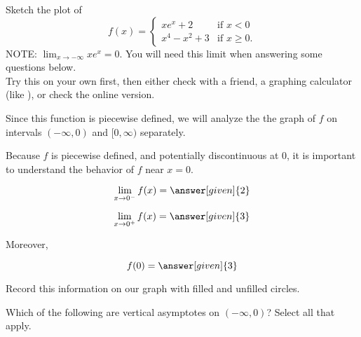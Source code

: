 \documentclass[wordchoicegiven]{ximera}
\begin{document}
\begin{example}
Sketch the plot of 
\[
f(x) = \begin{cases} xe^x+2 &\text{if $x<0$} \\
x^4-x^2+3 &\text{if $x \geq 0$}.
\end{cases}
\]
NOTE: $\lim_{x \to -\infty}xe^x=0$. You will need this limit when answering some questions below.\\
 Try this on your own first, then either check with a friend, a graphing calculator (like ), or check the online version.


	Since this function is piecewise defined, we will analyze the the graph of $f$ on intervals $(-\infty,0)$ and $[0,\infty)$ separately.

	Because $f$ is piecewise defined, and potentially discontinuous at $0$, it is important to understand the behavior of $f$ near $x = 0$.
	
	\[
		\lim_{x \to 0^-} f(x) = \answer[given]{2}
	\]
	
	\[
		\lim_{x \to 0^+} f(x) = \answer[given]{3}
	\]
	
	Moreover, 
	
	\[
	f(0) = \answer[given]{3}
	\]
	
	Record this information on our graph with filled and unfilled circles.

	\begin{image}
\end{image}
	
Which of the following are vertical asymptotes on $(-\infty,0)$?  Select all that apply.

\begin{selectAll}
\end{selectAll}


\end{example}
\end{document}
